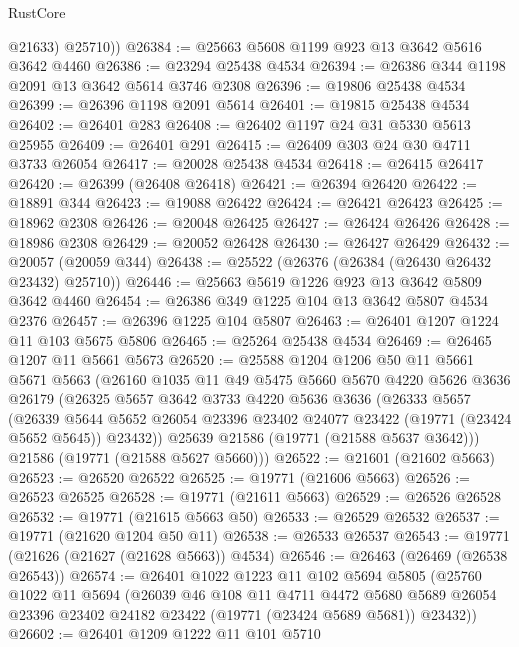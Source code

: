 \begin{lexlean}{RustCore}
\begin{coremodule}
          @21633)
        @25710))
@26384 := @25663 @5608 @1199 @923 @13 @3642 @5616 @3642 @4460
@26386 := @23294 @25438 @4534
@26394 := @26386 @344 @1198 @2091 @13 @3642 @5614 @3746 @2308
@26396 := @19806 @25438 @4534
@26399 := @26396 @1198 @2091 @5614
@26401 := @19815 @25438 @4534
@26402 := @26401 @283
@26408 := @26402 @1197 @24 @31 @5330 @5613 @25955
@26409 := @26401 @291
@26415 := @26409 @303 @24 @30 @4711 @3733 @26054
@26417 := @20028 @25438 @4534
@26418 := @26415 @26417
@26420 := @26399 (@26408 @26418)
@26421 := @26394 @26420
@26422 := @18891 @344
@26423 := @19088 @26422
@26424 := @26421 @26423
@26425 := @18962 @2308
@26426 := @20048 @26425
@26427 := @26424 @26426
@26428 := @18986 @2308
@26429 := @20052 @26428
@26430 := @26427 @26429
@26432 := @20057 (@20059 @344)
@26438 := @25522 (@26376 (@26384 (@26430 @26432 @23432) @25710))
@26446 := @25663 @5619 @1226 @923 @13 @3642 @5809 @3642 @4460
@26454 := @26386 @349 @1225 @104 @13 @3642 @5807 @4534 @2376
@26457 := @26396 @1225 @104 @5807
@26463 := @26401 @1207 @1224 @11 @103 @5675 @5806
@26465 := @25264 @25438 @4534
@26469 := @26465 @1207 @11 @5661 @5673
@26520 := @25588
    @1204
    @1206
    @50
    @11
    @5661
    @5671
    @5663
    (@26160
      @1035
      @11
      @49
      @5475
      @5660
      @5670
      @4220
      @5626
      @3636
      @26179
      (@26325
        @5657
        @3642
        @3733
        @4220
        @5636
        @3636
        (@26333
          @5657
          (@26339
            @5644
            @5652
            @26054
            @23396
            @23402
            @24077
            @23422
            (@19771 (@23424 @5652 @5645))
            @23432))
        @25639
        @21586
        (@19771 (@21588 @5637 @3642)))
      @21586
      (@19771 (@21588 @5627 @5660)))
@26522 := @21601 (@21602 @5663)
@26523 := @26520 @26522
@26525 := @19771 (@21606 @5663)
@26526 := @26523 @26525
@26528 := @19771 (@21611 @5663)
@26529 := @26526 @26528
@26532 := @19771 (@21615 @5663 @50)
@26533 := @26529 @26532
@26537 := @19771 (@21620 @1204 @50 @11)
@26538 := @26533 @26537
@26543 := @19771 (@21626 (@21627 (@21628 @5663)) @4534)
@26546 := @26463 (@26469 (@26538 @26543))
@26574 := @26401
    @1022
    @1223
    @11
    @102
    @5694
    @5805
    (@25760
      @1022
      @11
      @5694
      (@26039
        @46
        @108
        @11
        @4711
        @4472
        @5680
        @5689
        @26054
        @23396
        @23402
        @24182
        @23422
        (@19771 (@23424 @5689 @5681))
        @23432))
@26602 := @26401
    @1209
    @1222
    @11
    @101
    @5710

\end{coremodule}
\end{lexlean}
